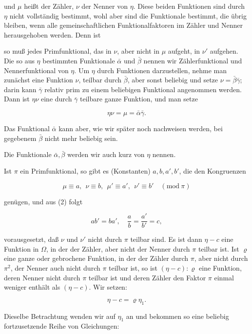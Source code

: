 

und $\mu$ heißt der Zähler, $\nu$ der Nenner von $\eta$. Diese beiden
Funktionen sind durch $\eta$ nicht vollständig bestimmt, wohl aber
sind die Funktionale bestimmt, die übrig bleiben, wenn alle
gemeinschaftlichen Funktionalfaktoren im Zähler und Nenner
herausgehoben werden. Denn ist


so muß jedes Primfunktional, das in $\nu$, aber nicht in $\mu$
aufgeht, in $\nu'$ aufgehen. Die so aus $\eta$ bestimmten Funktionale
$\bar\alpha$ und $\bar\beta$ nennen wir Zählerfunktional und
Nennerfunktional von $\eta$. Um $\eta$ durch Funktionen darzustellen,
nehme man zunächst eine Funktion $\nu$, teilbar durch $\bar\beta$,
aber sonst beliebig und setze $\nu = \bar\beta\bar\gamma$; darin kann
$\bar\gamma$ relativ prim zu einem beliebigen Funktional angenommen
werden. Dann ist $\eta\nu$ eine durch $\bar\gamma$ teilbare ganze
Funktion, und man setze

\[ \eta\nu = \mu = \bar\alpha\bar\gamma. \]

Das Funktional $\bar\alpha$ kann aber, wie wir später noch
nachweisen werden, bei gegebenem $\bar\beta$ nicht mehr beliebig
sein.

Die Funktionale $\bar\alpha, \bar\beta$ werden wir auch kurz  von $\eta$ nennen.

Ist $\pi$ ein Primfunktional, so gibt es  (Konstanten) $a, b,
a', b'$, die den Kongruenzen

\[ \mu \equiv a,\ \ \nu \equiv b,\ \ \mu' \equiv a',\ \ \nu' \equiv b' \quad (\mathrm{mod}\ \pi) \]

genügen, und aus (2) folgt

\[ ab' = ba', \quad \frac{a}{b} = \frac{a'}{b'} = c, \]

vorausgesetzt, daß $\nu$ und $\nu'$ nicht durch $\pi$ teilbar sind.
Es ist dann $\eta - c$ eine Funktion in $\Omega$, in der der Zähler,
aber nicht der Nenner durch $\pi$ teilbar ist. Ist $\varrho$ eine
ganze oder gebrochene Funktion, in der der Zähler durch $\pi$, aber
nicht durch $\pi^2$, der Nenner auch nicht durch $\pi$ teilbar ist,
so ist $(\eta - c) : \varrho$ eine Funktion, deren Nenner nicht durch
$\pi$ teilbar ist und deren Zähler den Faktor $\pi$ einmal weniger
enthält als $(\eta - c)$. Wir setzen:

\[ \eta - c = \varrho\eta_1. \]

Dieselbe Betrachtung wenden wir auf $\eta_1$ an und bekommen so eine
beliebig fortzusetzende Reihe von Gleichungen:
